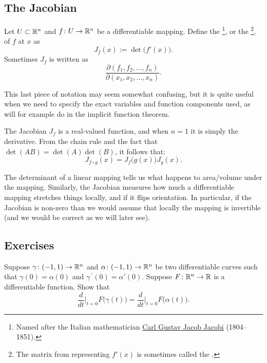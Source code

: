 \subsection{The Jacobian}

\begin{defn}
Let $U \subset {\mathbb{R}}^n$ and
$f \colon U \to {\mathbb{R}}^n$ be a differentiable mapping.  Define the
\emph{}%
\footnote{Named after the Italian mathematician
\href{https://en.wikipedia.org/wiki/Carl_Gustav_Jacob_Jacobi}{Carl Gustav Jacob Jacobi}
(1804--1851).},
or the
\emph{}%
\footnote{The matrix from  representing $f'(x)$
is sometimes called the
\emph{}.},
of $f$ at $x$ as
\begin{equation*}
J_f(x) := \det\bigl( f'(x) \bigr) .
\end{equation*}
Sometimes $J_f$ is written as
\begin{equation*}
\frac{\partial(f_1,f_2,\ldots,f_n)}{\partial(x_1,x_2,\ldots,x_n)} .
\end{equation*}
\end{defn}

This last piece of notation may seem somewhat confusing,
but it is quite useful when we need to specify
the exact variables and function components used,
as will for example do in the implicit function theorem.

The Jacobian $J_f$ is a real-valued function, and when $n=1$ it is simply the
derivative.
From the chain rule and the fact that $\det(AB) = \det(A)\det(B)$, it follows that:
\begin{equation*}
J_{f \circ g} (x) = J_f\bigl(g(x)\bigr) J_g(x) .
\end{equation*}

The determinant of a linear mapping tells us what happens to
area/volume under the mapping.
Similarly, the Jacobian measures how much a differentiable mapping stretches
things locally, and if it flips orientation.  In particular, if the Jacobian
is non-zero than we would assume that locally the mapping is invertible (and
we would be correct as we will later see).

\subsection{Exercises}

\begin{exercise}
Suppose $\gamma \colon (-1,1) \to {\mathbb{R}}^n$ and
$\alpha \colon (-1,1) \to {\mathbb{R}}^n$ be two differentiable curves
such that $\gamma(0) = \alpha(0)$ and $\gamma^{\:\prime}(0) = \alpha'(0)$.
Suppose $F \colon {\mathbb{R}}^n \to {\mathbb{R}}$ is a differentiable function.  Show that
\begin{equation*}
\frac{d}{dt}\Big|_{t=0}
F\bigl(\gamma(t)\bigr)
=
\frac{d}{dt}\Big|_{t=0}
F\bigl(\alpha(t)\bigr)
.
\end{equation*}
\end{exercise}

